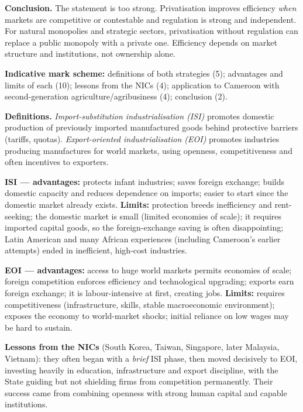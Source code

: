 \documentclass[11pt]{article}
\begin{document}
\begin{corrige}
\textbf{Conclusion.} The statement is too strong. Privatisation improves efficiency \emph{when} markets are competitive or contestable and regulation is strong and independent. For natural monopolies and strategic sectors, privatisation without regulation can replace a public monopoly with a private one. Efficiency depends on market structure and institutions, not ownership alone.
\end{corrige}

\begin{corrige}
\textbf{Indicative mark scheme:} definitions of both strategies (5); advantages and limits of each (10); lessons from the NICs (4); application to Cameroon with second-generation agriculture/agribusiness (4); conclusion (2).

\textbf{Definitions.} \emph{Import-substitution industrialisation (ISI)} promotes domestic production of previously imported manufactured goods behind protective barriers (tariffs, quotas). \emph{Export-oriented industrialisation (EOI)} promotes industries producing manufactures for world markets, using openness, competitiveness and often incentives to exporters.

\textbf{ISI — advantages:} protects infant industries; saves foreign exchange; builds domestic capacity and reduces dependence on imports; easier to start since the domestic market already exists. \textbf{Limits:} protection breeds inefficiency and rent-seeking; the domestic market is small (limited economies of scale); it requires imported capital goods, so the foreign-exchange saving is often disappointing; Latin American and many African experiences (including Cameroon's earlier attempts) ended in inefficient, high-cost industries.

\textbf{EOI — advantages:} access to huge world markets permits economies of scale; foreign competition enforces efficiency and technological upgrading; exports earn foreign exchange; it is labour-intensive at first, creating jobs. \textbf{Limits:} requires competitiveness (infrastructure, skills, stable macroeconomic environment); exposes the economy to world-market shocks; initial reliance on low wages may be hard to sustain.

\textbf{Lessons from the NICs} (South Korea, Taiwan, Singapore, later Malaysia, Vietnam): they often began with a \emph{brief} ISI phase, then moved decisively to EOI, investing heavily in education, infrastructure and export discipline, with the State guiding but not shielding firms from competition permanently. Their success came from combining openness with strong human capital and capable institutions.


\end{corrige}
\end{document}
